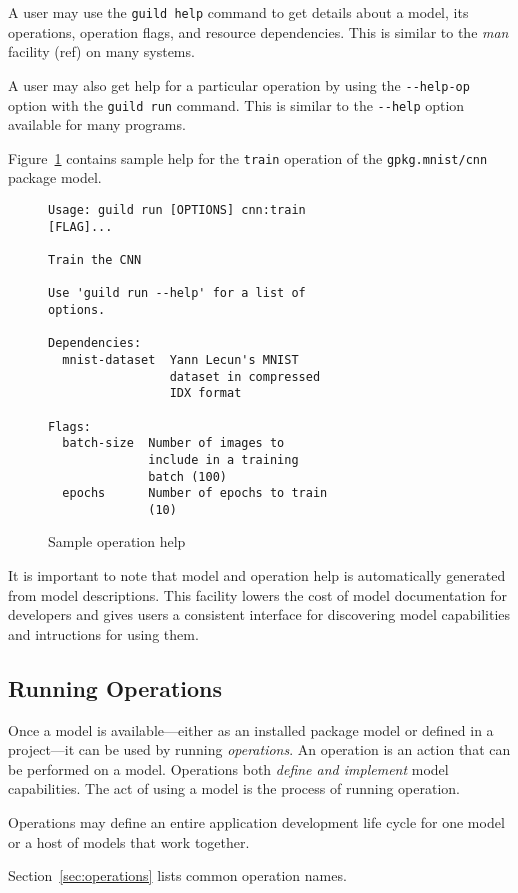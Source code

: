 \documentclass{article}
\begin{document}
A user may use the \verb|guild help| command to get details about a
model, its operations, operation flags, and resource
dependencies. This is similar to the \emph{man} facility (ref) on many
systems.

A user may also get help for a particular operation by using the
\verb|--help-op| option with the \verb|guild run| command. This is
similar to the \verb|--help| option available for many programs.

Figure~\ref{fig:op-help} contains sample help for the \verb|train|
operation of the \verb|gpkg.mnist/cnn| package model.

\begin{figure}
\begin{lstlisting}
Usage: guild run [OPTIONS] cnn:train
[FLAG]...

Train the CNN

Use 'guild run --help' for a list of
options.

Dependencies:
  mnist-dataset  Yann Lecun's MNIST
                 dataset in compressed
                 IDX format

Flags:
  batch-size  Number of images to
              include in a training
              batch (100)
  epochs      Number of epochs to train
              (10)
\end{lstlisting}
\caption{Sample operation help}
\label{fig:op-help}
\end{figure}

It is important to note that model and operation help is automatically
generated from model descriptions. This facility lowers the cost of
model documentation for developers and gives users a consistent
interface for discovering model capabilities and intructions for using
them.

\subsection{Running Operations}

Once a model is available---either as an installed package model or
defined in a project---it can be used by running \emph{operations}. An
operation is an action that can be performed on a model. Operations
both \emph{define and implement} model capabilities. The act of using
a model is the process of running operation.

Operations may define an entire application development life cycle for
one model or a host of models that work together.

Section~\ref{sec:operations} lists common operation names.
\end{document}
